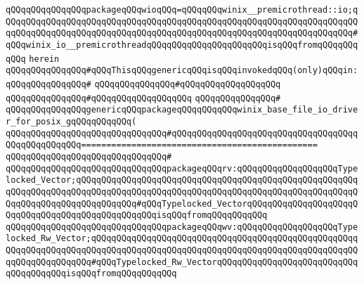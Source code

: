 \verb|qQQqqQQqqQQqqQQqpackageqQQqwioqQQq=qQQqqQQqwinix__premicrothread::io;qQQqqQQqqQQqqQQqqQQqqQQqqQQqqQQqqQQqqQQqqQQqqQQqqQQqqQQqqQQqqQQqqQQqqQQqqQQqqQQqqQQqqQQqqQQqqQQqqQQqqQQqqQQqqQQqqQQqqQQqqQQqqQQqqQQqqQQqqQQq#qQQqwinix_io__premicrothreadqQQqqQQqqQQqqQQqqQQqqQQqisqQQqfromqQQqqQQqqQQq|\newline
\verb|herein|\newline
\newline
\verb|qQQqqQQqqQQqqQQq#qQQqThisqQQqgenericqQQqisqQQqinvokedqQQq(only)qQQqin:|\newline
\verb|qQQqqQQqqQQqqQQq#|\newline
\verb|qQQqqQQqqQQqqQQq#qQQqqQQqqQQqqQQqqQQq|\newline
\verb|qQQqqQQqqQQqqQQq#qQQqqQQqqQQqqQQqqQQq|\newline
\verb|qQQqqQQqqQQqqQQq#|\newline
\verb|qQQqqQQqqQQqqQQqgenericqQQqpackageqQQqqQQqqQQqwinix_base_file_io_driver_for_posix_gqQQqqQQqqQQq(|\newline
\verb|qQQqqQQqqQQqqQQqqQQqqQQqqQQqqQQq#qQQqqQQqqQQqqQQqqQQqqQQqqQQqqQQqqQQqqQQqqQQqqQQqqQQq===============================================|\newline
\verb|qQQqqQQqqQQqqQQqqQQqqQQqqQQqqQQq#|\newline
\verb|qQQqqQQqqQQqqQQqqQQqqQQqqQQqqQQqpackageqQQqrv:qQQqqQQqqQQqqQQqqQQqTypelocked_Vector;qQQqqQQqqQQqqQQqqQQqqQQqqQQqqQQqqQQqqQQqqQQqqQQqqQQqqQQqqQQqqQQqqQQqqQQqqQQqqQQqqQQqqQQqqQQqqQQqqQQqqQQqqQQqqQQqqQQqqQQqqQQqqQQqqQQqqQQqqQQqqQQqqQQqqQQq#qQQqTypelocked_VectorqQQqqQQqqQQqqQQqqQQqqQQqqQQqqQQqqQQqqQQqqQQqqQQqqQQqisqQQqfromqQQqqQQqqQQq|\newline
\verb|qQQqqQQqqQQqqQQqqQQqqQQqqQQqqQQqpackageqQQqwv:qQQqqQQqqQQqqQQqqQQqTypelocked_Rw_Vector;qQQqqQQqqQQqqQQqqQQqqQQqqQQqqQQqqQQqqQQqqQQqqQQqqQQqqQQqqQQqqQQqqQQqqQQqqQQqqQQqqQQqqQQqqQQqqQQqqQQqqQQqqQQqqQQqqQQqqQQqqQQqqQQqqQQqqQQqqQQq#qQQqTypelocked_Rw_VectorqQQqqQQqqQQqqQQqqQQqqQQqqQQqqQQqqQQqqQQqisqQQqfromqQQqqQQqqQQq|\newline
